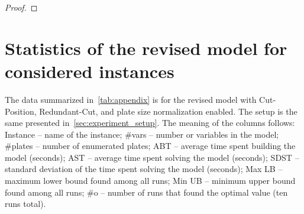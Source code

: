 \documentclass[runningheads]{llncs}
\begin{document}
\begin{proof}
\end{proof}

\section{Statistics of the revised model for considered instances}
\label{sec:appendix_table}

The data summarized in~\autoref{tab:appendix} is for the revised model with Cut-Position, Redundant-Cut, and plate size normalization enabled.
The setup is the same presented in~\autoref{sec:experiment_setup}.
The meaning of the columns follows:
Instance -- name of the instance;
\#vars -- number or variables in the model;
\#plates -- number of enumerated plates;
ABT -- average time spent building the model (seconds);
AST -- average time spent solving the model (seconds);
SDST -- standard deviation of the time spent solving the model (seconds);
Max LB -- maximum lower bound found among all runs;
Min UB -- minimum upper bound found among all runs;
\#o -- number of runs that found the optimal value (ten runs total).
\end{document}
